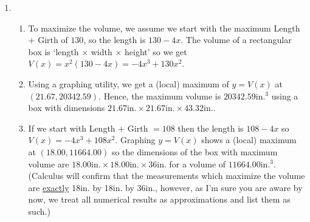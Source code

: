 \documentclass{ximera}
\begin{document}
\begin{enumerate}
\item \begin{enumerate}

\item To maximize the volume, we assume we start with the maximum Length $+$ Girth of $130$,  so the length is $130 - 4x$.  The volume of a rectangular box is  `length $\times$ width $\times$ height' so we get $V(x) = x^{2}(130 - 4x) = -4x^{3} + 130x^{2}$.  

\item Using a graphing utility, we get a (local) maximum of  $y = V(x)$ at $(21.67, 20342.59)$.  Hence, the maximum volume is $20342.59\mbox{in.}^{3}$ using a box with dimensions $21.67\mbox{in.} \times 21.67\mbox{in.} \times 43.32\mbox{in.}$.

\item If we start with Length $+$ Girth $= 108$ then the length is $108 - 4x$ so  $V(x) = -4x^{3} + 108x^{2}$.  Graphing $y = V(x)$  shows a (local) maximum at $(18.00, 11664.00)$ so the dimensions of the box with maximum volume are $18.00\mbox{in.} \times 18.00\mbox{in.} \times 36\mbox{in.}$ for a volume of $11664.00\mbox{in.}^{3}$.  (Calculus will confirm that the measurements which maximize the volume are \underline{exactly} 18in. by 18in. by 36in., however, as I'm sure you are aware by now, we treat all numerical results as approximations and list them as such.)

\end{enumerate}

\setcounter{HW}{\value{enumi}}
\end{enumerate}
\end{document}
